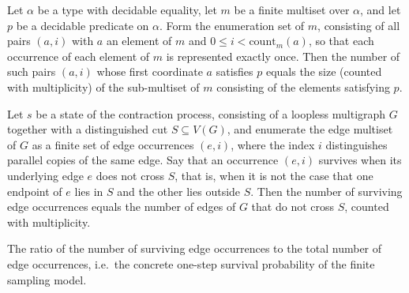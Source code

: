\begin{lemma}
\label{KargerTrace.toEnumFinset_filter_fst_card_eq_filter_card}
\leanok
{}
Let $\alpha$ be a type with decidable equality, let $m$ be a finite multiset over
$\alpha$, and let $p$ be a decidable predicate on $\alpha$. Form the enumeration set of
$m$, consisting of all pairs $(a, i)$ with $a$ an element of $m$ and $0 \le i <
\text{count}_m(a)$, so that each occurrence of each element of $m$ is represented
exactly once. Then the number of such pairs $(a,i)$ whose first coordinate $a$ satisfies
$p$ equals the size (counted with multiplicity) of the sub-multiset of $m$ consisting of
the elements satisfying $p$.
\end{lemma}

\begin{lemma}
\label{KargerTrace.edgeChoiceSurvivalCount_eq_nonCrossingChoiceCount}
\leanok
{}
Let $s$ be a state of the contraction process, consisting of a loopless multigraph $G$
together with a distinguished cut $S \subseteq V(G)$, and enumerate the edge multiset of
$G$ as a finite set of edge occurrences $(e, i)$, where the index $i$ distinguishes
parallel copies of the same edge. Say that an occurrence $(e, i)$ survives when its
underlying edge $e$ does not cross $S$, that is, when it is not the case that one
endpoint of $e$ lies in $S$ and the other lies outside $S$. Then the number of surviving
edge occurrences equals the number of edges of $G$ that do not cross $S$, counted with
multiplicity.
\end{lemma}

\begin{definition}
\label{KargerTrace.edgeChoiceSurvivalRatio}
\leanok
{}
The ratio of the number of surviving edge occurrences to the total number of edge
occurrences, i.e.\ the concrete one-step survival probability of the finite sampling model.
\end{definition}

